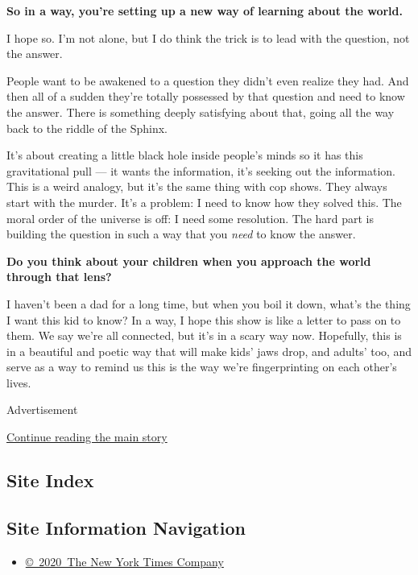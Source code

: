 \textbf{So in a way, you're setting up a new way of learning about the
world.}

I hope so. I'm not alone, but I do think the trick is to lead with the
question, not the answer.

People want to be awakened to a question they didn't even realize they
had. And then all of a sudden they're totally possessed by that question
and need to know the answer. There is something deeply satisfying about
that, going all the way back to the riddle of the Sphinx.

It's about creating a little black hole inside people's minds so it has
this gravitational pull --- it wants the information, it's seeking out
the information. This is a weird analogy, but it's the same thing with
cop shows. They always start with the murder. It's a problem: I need to
know how they solved this. The moral order of the universe is off: I
need some resolution. The hard part is building the question in such a
way that you \emph{need} to know the answer.

\textbf{Do you think about your children when you approach the world
through that lens?}

I haven't been a dad for a long time, but when you boil it down, what's
the thing I want this kid to know? In a way, I hope this show is like a
letter to pass on to them. We say we're all connected, but it's in a
scary way now. Hopefully, this is in a beautiful and poetic way that
will make kids' jaws drop, and adults' too, and serve as a way to remind
us this is the way we're fingerprinting on each other's lives.

Advertisement

\protect\hyperlink{after-bottom}{Continue reading the main story}

\hypertarget{site-index}{%
\subsection{Site Index}\label{site-index}}

\hypertarget{site-information-navigation}{%
\subsection{Site Information
Navigation}\label{site-information-navigation}}

\begin{itemize}
\tightlist
\item
  \href{https://help.nytimes3xbfgragh.onion/hc/en-us/articles/115014792127-Copyright-notice}{©~2020~The
  New York Times Company}
\end{itemize}

